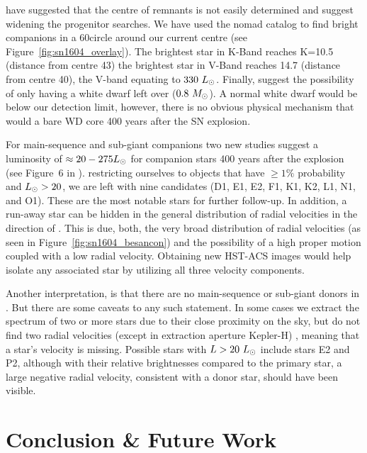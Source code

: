 \documentclass[preprint2]{aastex}
\begin{document}
\cite{2013arXiv1305.0567W} have suggested that the centre of remnants is not easily determined and suggest widening the progenitor searches. We have used the \gls{nomad} catalog to find bright companions in a 60\arcsec circle around our current centre (see Figure~\ref{fig:sn1604_overlay}). The brightest star in K-Band reaches K=10.5 (distance from centre 43\arcsec)  the brightest star in V-Band reaches 14.7 (distance from centre 40\arcsec), the V-band equating to $330~\hbox{$L_{\odot}$}$.   Finally, \citet{2012A&A...537A.139C}  suggest the possibility of only having a white dwarf left over ($0.8~\hbox{$M_{\odot}$}$).  A normal white dwarf would be below our detection limit, however, there is no obvious physical mechanism that would a bare WD core 400 years after the SN explosion.

For main-sequence and sub-giant companions two new studies  \citep{2012arXiv1205.5028S,2012ApJ...760...21P} suggest a luminosity of $\approx 20 - 275 \hbox{$L_{\odot}$}$ for companion stars 400 years after the explosion (see Figure~6 in \citep{2012ApJ...760...21P}). restricting ourselves to objects that have $\ge 1 \%$ probability and $\hbox{$L_{\odot}$} > 20$, we are left with nine candidates (D1, E1, E2, F1, K1, K2, L1, N1, and O1). These are the most notable stars for further follow-up. In addition, a run-away star can be hidden in the general distribution of radial velocities in the direction of . This is due, both, the very broad distribution of radial velocities (as seen in Figure~\ref{fig:sn1604_besancon}) and the possibility of a high proper motion coupled with a low radial velocity. Obtaining new HST-ACS images would help isolate any associated star by utilizing all three velocity components. 

Another interpretation, is that there are no main-sequence or sub-giant donors in . But there are some caveats to any such statement.  In some cases we extract the spectrum of two or more stars due to their close proximity on the sky, but do not find two radial velocities (except in extraction aperture Kepler-H) , meaning that a star's velocity is missing. Possible stars with $L>20~\hbox{$L_{\odot}$}$ include stars E2 and P2, although with their relative brightnesses compared to the primary star, a large negative radial velocity, consistent with a donor star, should have been visible.
 






\section{Conclusion \& Future Work}
\end{document}
